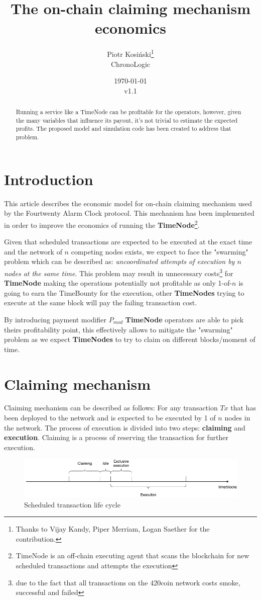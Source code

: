 \documentclass{article}
\title{The on-chain claiming mechanism economics}
\author{Piotr Kosiński\thanks{Thanks to Vijay Kandy, Piper Merriam, Logan Saether for the contribution.}\\ChronoLogic}
\date{\today\\v1.1}
\begin{document}
  \maketitle
  \begin{abstract}
    Running a service like a TimeNode can be profitable for the operators, however, given the many variables that influence its payout,  it's not trivial to estimate the expected profits. The proposed model and simulation code has been created to address that problem.
  \end{abstract}
  \section{Introduction}
  This article describes the economic model for on-chain claiming mechanism used by the Fourtwenty Alarm Clock protocol. This mechanism has been implemented in order to improve the economics of running the \textbf{TimeNode}\footnote{TimeNode is an off-chain executing agent that scans the blockchain for new scheduled transactions and attempts the execution}. 
  
  Given that scheduled transactions are expected to be executed at the exact time and the network of $n$ competing nodes exists, we expect to face the "swarming" problem which can be described as: \textit{uncoordinated attempts of execution by $n$ nodes at the same time}. This problem may result in unnecessary costs\footnote{due to the fact that all transactions on the 420coin network costs smoke, successful and failed} for \textbf{TimeNode} making the operations potentially not profitable as only 1-of-$n$ is going to earn the TimeBounty for the execution, other \textbf{TimeNodes} trying to execute at the same block will pay the failing transaction cost.
  
  By introducing payment modifier $P_{mod}$ \textbf{TimeNode} operators are able to pick theirs profitability point, this effectively allows to mitigate the "swarming" problem as we expect \textbf{TimeNodes} to try to claim on different blocks/moment of time. 
  \section{Claiming mechanism}
  Claiming mechanism can be described as follows:
  For any transaction $Tx$ that has been deployed to the network and is expected to be executed by 1 of $n$ nodes in the network. The process of execution is divided into two steps:
  \textbf{claiming} and \textbf{execution}. Claiming is a process of reserving the transaction for further execution.
  \begin{figure}
    \includegraphics[width=\linewidth]{timeranges.png}
    \caption{Scheduled transaction life cycle}
    \label{fig:boat1}
  \end{figure}
  
\end{document}
